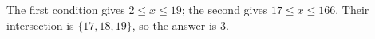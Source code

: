 The first condition gives $2\le x\le19$; the second gives $17\le x\le166$. Their intersection is $\{17,18,19\}$, so the answer is $\boxed3$.
